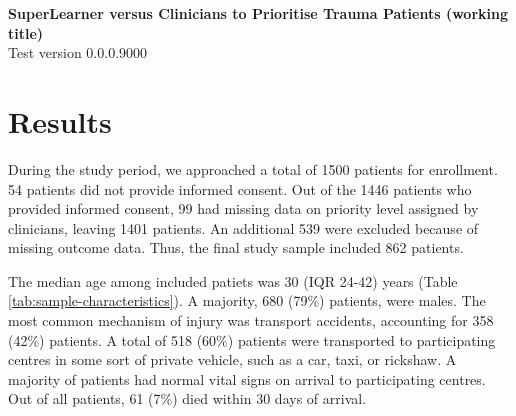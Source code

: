 \documentclass[10pt,letterpaper]{article}\usepackage[]{graphicx}\usepackage[]{color}
\begin{document}
{\Large
  \noindent\textbf{SuperLearner versus Clinicians to Prioritise Trauma Patients (working title)}
} \newline
\\
{\large
  Test version 0.0.0.9000
}
\section*{Results}
During the study period, we approached a total of 1500 patients
for enrollment. 54 patients did
not provide informed consent. Out of the 1446
patients who provided informed consent, 99 had missing data on priority level
assigned by clinicians, leaving 1401
patients. An additional 539 were excluded because of missing outcome
data. Thus, the final study sample included
862 patients.

The median age among included patiets was 30 (IQR 24-42) years (Table
\ref{tab:sample-characteristics}). A majority, 680 (79\%)
patients, were males. The most common mechanism of injury was transport
accidents, accounting for 358 (42\%)
patients. A total of 518 (60\%) patients were
transported to participating centres in some sort of private vehicle, such as a
car, taxi, or rickshaw. A majority of patients had normal vital signs on arrival
to participating centres. Out of all patients, 61 (7\%)
died within 30 days of arrival.
\end{document}
